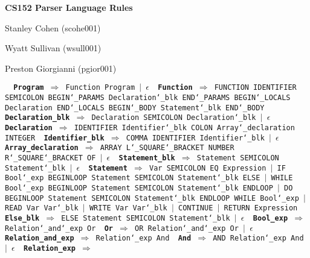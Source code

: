 \documentclass{article}
\begin{document}
 
 
\centerline{\large \bf CS152 Parser Language Rules}
\centerline{Stanley Cohen (scohe001)}
\centerline{Wyatt Sullivan (wsull001)}
\centerline{Preston Giorgianni (pgior001)}

\smallskip
\hrulefill
\smallskip


\smallskip 
\hrulefill
\smallskip 

\texttt{
{\vskip 0.1in \noindent\bf Program} $\Rightarrow$ 
        Function Program $|$ $\epsilon$
{\vskip 0.1in \noindent\bf Function} $\Rightarrow$ 
        FUNCTION IDENTIFIER SEMICOLON BEGIN\char`_PARAMS Declaration\char`_blk 
        END\char`_PARAMS BEGIN\char`_LOCALS Declaration END\char`_LOCALS BEGIN\char`_BODY 
        Statement\char`_blk END\char`_BODY
\
{\vskip 0.1in \noindent\bf Declaration\_blk} $\Rightarrow$ 
    Declaration SEMICOLON Declaration\char`_blk $|$ $\epsilon$
{\vskip 0.1in \noindent\bf Declaration} $\Rightarrow$ 
    IDENTIFIER Identifier\char`_blk COLON Array\char`_declaration INTEGER
{\vskip 0.1in \noindent\bf Identifier\_blk} $\Rightarrow$ 
    COMMA IDENTIFIER Identifier\char`_blk $|$ $\epsilon$
{\vskip 0.1in \noindent\bf Array\_declaration} $\Rightarrow$ 
    ARRAY L\char`_SQUARE\char`_BRACKET NUMBER R\char`_SQUARE\char`_BRACKET OF $|$ $\epsilon$
{\vskip 0.1in \noindent\bf Statement\_blk} $\Rightarrow$ 
    Statement SEMICOLON Statement\char`_blk $|$ $\epsilon$
{\vskip 0.1in \noindent\bf Statement} $\Rightarrow$ 
    Var SEMICOLON EQ Expression $|$ IF Bool\char`_exp BEGINLOOP Statement SEMICOLON Statement\char`_blk ELSE $|$ WHILE Bool\char`_exp BEGINLOOP Statement SEMICOLON Statement\char`_blk ENDLOOP $|$ DO BEGINLOOP Statement SEMICOLON Statement\char`_blk ENDLOOP WHILE Bool\char`_exp $|$ READ Var Var\char`_blk $|$ WRITE Var Var\char`_blk $|$ CONTINUE $|$ RETURN Expression
{\vskip 0.1in \noindent\bf Else\_blk} $\Rightarrow$ 
    ELSE Statement SEMICOLON Statement\char`_blk $|$ $\epsilon$
{\vskip 0.1in \noindent\bf Bool\_exp} $\Rightarrow$ 
    Relation\char`_and\char`_exp Or
{\vskip 0.1in \noindent\bf Or} $\Rightarrow$ 
    OR Relation\char`_and\char`_exp Or $|$ $\epsilon$
{\vskip 0.1in \noindent\bf Relation\_and\_exp} $\Rightarrow$ 
    Relation\char`_exp And
{\vskip 0.1in \noindent\bf And} $\Rightarrow$ 
    AND Relation\char`_exp And $|$ $\epsilon$
{\vskip 0.1in \noindent\bf Relation\_exp} $\Rightarrow$ 
}
\end{document}
